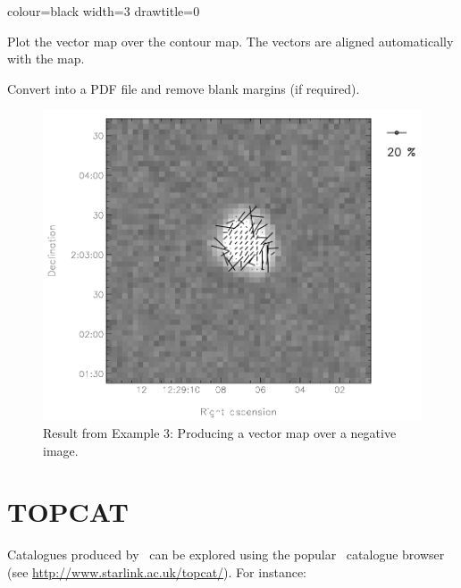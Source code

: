 \begin{terminalv}
colour=black
width=3
drawtitle=0
\end{terminalv}


Plot the vector map over the contour map. The vectors are aligned automatically with the map.

\begin{terminalv}
\end{terminalv}


Convert into a PDF file and remove blank margins (if required).

\begin{terminalv}
\end{terminalv}


\begin{figure}[t!]
\begin{center}
\includegraphics[width=0.75\linewidth]{sc22-kappa-plots-plot3.png}
\caption [Vector map with negative image in polplot]{Result from
  Example 3: Producing a vector map over a negative image.\label{fig:kappa-plot3}}
\end{center}
\end{figure}


\section{TOPCAT}

Catalogues produced by \poltwomap\ can be explored using the popular
\topcat\ catalogue browser (see \url{http://www.starlink.ac.uk/topcat/}). For
instance:

\begin{terminalv}
\end{terminalv}

